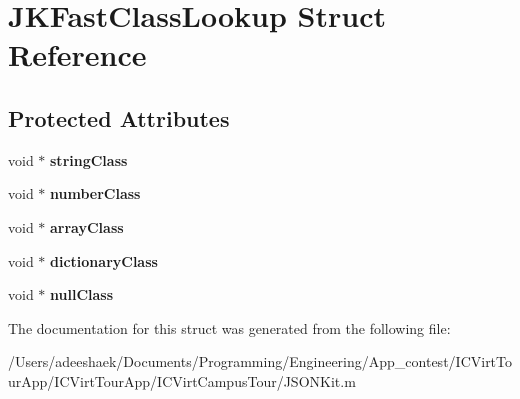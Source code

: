 \hypertarget{struct_j_k_fast_class_lookup}{\section{J\-K\-Fast\-Class\-Lookup Struct Reference}
\label{struct_j_k_fast_class_lookup}
}
\subsection*{Protected Attributes}
\begin{DoxyCompactItemize}
\item 
\hypertarget{struct_j_k_fast_class_lookup_ab06ebd7799f76aa30aa00b69409749fd}{void $\ast$ {\bfseries string\-Class}}\label{struct_j_k_fast_class_lookup_ab06ebd7799f76aa30aa00b69409749fd}

\item 
\hypertarget{struct_j_k_fast_class_lookup_a87800ae53dbf28d786e2cc2e8a203fa9}{void $\ast$ {\bfseries number\-Class}}\label{struct_j_k_fast_class_lookup_a87800ae53dbf28d786e2cc2e8a203fa9}

\item 
\hypertarget{struct_j_k_fast_class_lookup_a3081d9eff020a859ea995a790d3ccd83}{void $\ast$ {\bfseries array\-Class}}\label{struct_j_k_fast_class_lookup_a3081d9eff020a859ea995a790d3ccd83}

\item 
\hypertarget{struct_j_k_fast_class_lookup_a59eb41fd71fe719ec787dae1a7267373}{void $\ast$ {\bfseries dictionary\-Class}}\label{struct_j_k_fast_class_lookup_a59eb41fd71fe719ec787dae1a7267373}

\item 
\hypertarget{struct_j_k_fast_class_lookup_a5bc501c70dc61af855e607b5321e4a71}{void $\ast$ {\bfseries null\-Class}}\label{struct_j_k_fast_class_lookup_a5bc501c70dc61af855e607b5321e4a71}

\end{DoxyCompactItemize}


The documentation for this struct was generated from the following file\-:\begin{DoxyCompactItemize}
\item 
/\-Users/adeeshaek/\-Documents/\-Programming/\-Engineering/\-App\-\_\-contest/\-I\-C\-Virt\-Tour\-App/\-I\-C\-Virt\-Tour\-App/\-I\-C\-Virt\-Campus\-Tour/J\-S\-O\-N\-Kit.\-m\end{DoxyCompactItemize}
